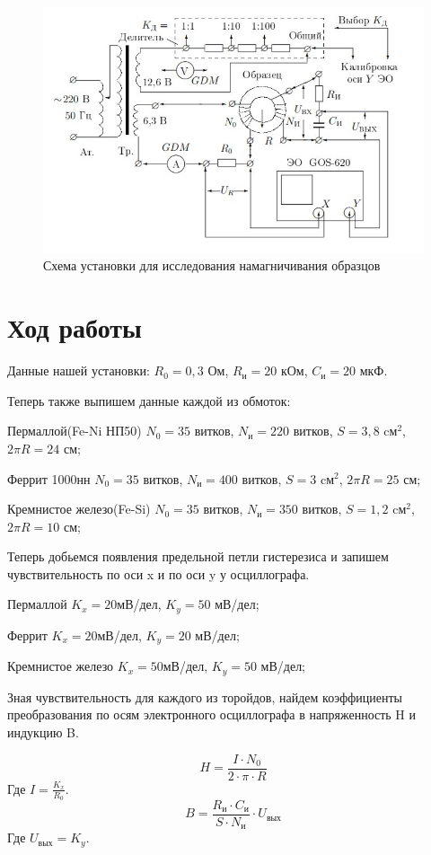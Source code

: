 \documentclass[a4paper,12pt]{article}
\begin{document}
	\begin{figure}[h!]
		\centering
		\includegraphics[width=\linewidth]{gist.jpg}
		\caption{Схема установки для исследования намагничивания образцов}
		\label{fig:Holl2}
	\end{figure}

\section{Ход работы}
Данные нашей установки: $R_0 = 0,3$ Ом, $R_\text{и} = 20$ кОм, $C_\text{и} = 20$ мкФ.

Теперь также выпишем данные каждой из обмоток:

Пермаллой(Fe-Ni НП50) $N_0 = 35$ витков, $N_\text{и} = 220$ витков, $S = 3,8$ cм$^2$, $2 \pi R = 24$ см;

Феррит 1000нн $N_0 = 35$ витков, $N_\text{и} = 400$ витков, $S = 3$ cм$^2$, $2 \pi R = 25$ см;

Кремнистое железо(Fe-Si) $N_0 = 35$ витков, $N_\text{и} = 350$ витков, $S = 1,2$ cм$^2$, $2 \pi R = 10$ см;

Теперь добьемся появления предельной петли гистерезиса и запишем чувствительность по оси x и по оси y у осциллографа.

Пермаллой $K_x = 20$мВ/дел, $K_y = 50$ мВ/дел;

Феррит $K_x = 20$мВ/дел, $K_y = 20$ мВ/дел;

Кремнистое железо $K_x = 50$мВ/дел, $K_y = 50$ мВ/дел;

Зная чувствительность для каждого из торойдов, найдем коэффициенты преобразования по осям электронного осциллографа в напряженность H и индукцию B.

\[H = \frac{I \cdot N_0}{2 \cdot \pi \cdot R}\]
Где $I= \frac{K_x}{R_0}$.
\[B = \frac{R_\text{и} \cdot C_\text{и}}{S \cdot N_\text{и}} \cdot U_\text{вых}\]
Где $U_\text{вых} = K_y$.
\end{document}

